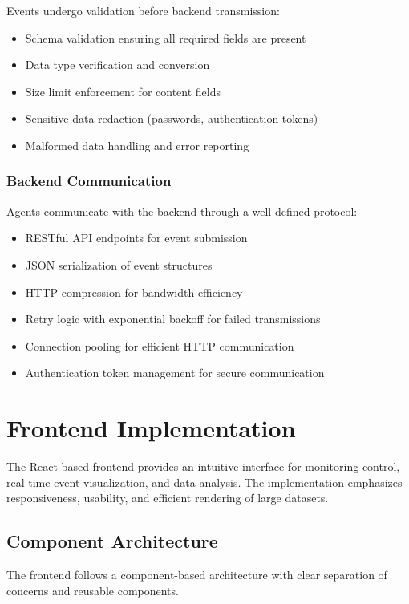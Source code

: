 Events undergo validation before backend transmission:

\begin{itemize}
    \item Schema validation ensuring all required fields are present
    \item Data type verification and conversion
    \item Size limit enforcement for content fields
    \item Sensitive data redaction (passwords, authentication tokens)
    \item Malformed data handling and error reporting
\end{itemize}

\subsubsection{Backend Communication}

Agents communicate with the backend through a well-defined protocol:

\begin{itemize}
    \item RESTful API endpoints for event submission
    \item JSON serialization of event structures
    \item HTTP compression for bandwidth efficiency
    \item Retry logic with exponential backoff for failed transmissions
    \item Connection pooling for efficient HTTP communication
    \item Authentication token management for secure communication
\end{itemize}

\section{Frontend Implementation}

The React-based frontend provides an intuitive interface for monitoring control, real-time event visualization, and data analysis. The implementation emphasizes responsiveness, usability, and efficient rendering of large datasets.

\subsection{Component Architecture}

The frontend follows a component-based architecture with clear separation of concerns and reusable components.

